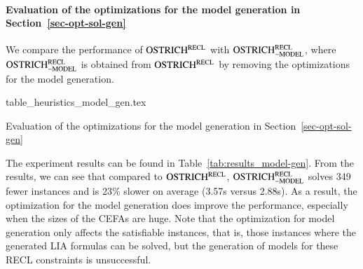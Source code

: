 \paragraph*{Evaluation of the optimizations for the model generation in Section~\ref{sec-opt-sol-gen}}

We compare the performance of $\rm OSTRICH^{RECL}$ with $\rm OSTRICH^{RECL}_{\rm -MODEL}$, where $\rm OSTRICH^{RECL}_{\rm -MODEL}$ is obtained from $\rm OSTRICH^{RECL}$ by removing the optimizations for the model generation. 

\begin{table}[htbp]
  \centering
  {table_heuristics_model_gen.tex}
  \caption{Evaluation of the optimizations for the model generation in Section~\ref{sec-opt-sol-gen}}\label{tab:results_model-gen}
\end{table}

The experiment results can be found in Table~\ref{tab:results_model-gen}. From the results, we can see that compared to $\rm OSTRICH^{RECL}$, $\rm OSTRICH^{RECL}_{\rm -MODEL}$ solves 349 fewer instances and is 23\% slower on average (3.57s versus 2.88s). As a result, the optimization for the model generation does improve the performance, especially when the sizes of the CEFAs are huge.  
Note that the optimization for model generation only affects the satisfiable instances, that is, those instances where the generated LIA formulas can be solved, but the generation of models for these RECL constraints is unsuccessful. 


